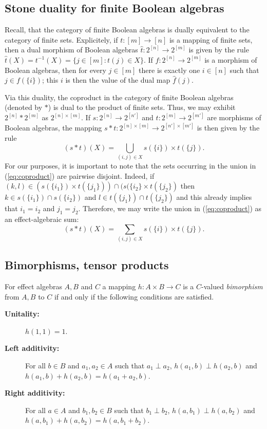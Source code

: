 \documentclass[smallextended]{svjour3}
\begin{document}
\subsection{Stone duality for finite Boolean algebras}

Recall, that the category of finite Boolean algebras is dually equivalent to the category of finite sets.
Explicitely, if $t:[m]\to [n]$ is a mapping of finite sets, then a dual morphism of Boolean
algebras
$\widehat t:2^{[n]}\to 2^{[m]}$ is given by the rule $\widehat t(X)=t^{-1}(X)=\{j\in[m]:t(j)\in X\}$.
If $f:2^{[n]}\to 2^{[m]}$ is a morphism of Boolean algebras, then for
every $j\in [m]$ there is exactly one $i\in[n]$ such that $j\in f(\{i\})$; this
$i$ is then the value of the dual map $\widehat f(j)$.

Via this duality, 
the coproduct in the category of finite Boolean algebras (denoted by $*$) is
dual to the product of finite sets.
Thus, we may exhibit $2^{[n]}*2^{[m]}$ as $2^{[n]\times[m]}$. If 
$s:2^{[n]}\to 2^{[n']}$ and $t:2^{[m]}\to 2^{[m']}$
are morphisms of Boolean algebras, the mapping
$s*t:2^{[n]\times[m]}\to 2^{[n']\times[m']}$ is then given by the
rule
\begin{equation}
\label{eq:coproduct}
(s*t)(X)=\bigcup_{(i,j)\in X}s(\{i\})\times t(\{j\}).
\end{equation}
For our purposes, it is important to note that the sets occurring in the union in (\ref{eq:coproduct}) are pairwise disjoint. Indeed,
if $(k,l)\in (s(\{i_1\})\times t(\{j_1\}))\cap(s(\{i_2\}\times t(\{j_2\})$
then $k\in s(\{i_1\})\cap s(\{i_2\})$ and $l\in t(\{j_1\})\cap t(\{j_2\})$
and this already implies that $i_1=i_2$ and $j_1=j_2$. Therefore, we may write
the union in (\ref{eq:coproduct}) as an effect-algebraic sum:
\begin{equation}
\label{eq:coproduct2}
(s*t)(X)=\sum_{(i,j)\in X}s(\{i\})\times t(\{j\}).
\end{equation}

\subsection{Bimorphisms, tensor products}

For effect algebras $A,B$ and $C$ a mapping $h:A\times B\to C$ is a $C$-valued {\em bimorphism}
\cite{dvurevcenskij1995tensor}
from $A,B$ to $C$ if and only if the following conditions are satisfied.
\begin{description}
\item[\bf Unitality:] $h(1,1)=1$.
\item[\bf Left additivity:] For all $b\in B$ and $a_1,a_2\in A$ such that $a_1\perp a_2$, $h(a_1,b)\perp h(a_2,b)$ and
$h(a_1,b)+h(a_2,b)=h(a_1+a_2,b)$.
\item[\bf Right additivity:] For all $a\in A$ and $b_1,b_2\in B$ such that $b_1\perp b_2$, $h(a,b_1)\perp h(a,b_2)$ and
$h(a,b_1)+h(a,b_2)=h(a,b_1+b_2)$.
\end{description}
\end{document}
